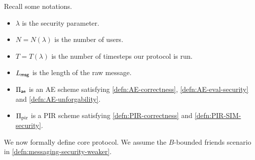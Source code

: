 Recall some notations.
\begin{itemize}
    \item $\lambda$ is the security parameter.
    \item $N = N(\lambda)$ is the number of users.
    \item $T = T(\lambda)$ is the number of timesteps our protocol is run.
    \item $L_{\mathsf{msg}}$ is the length of the raw message.
    \item $\Pi_{\mathsf{ae}}$ is an AE scheme satisfying \cref{defn:AE-correctness}, \cref{defn:AE-eval-security} and \cref{defn:AE-unforgability}.
    \item $\Pi_{\text{pir}}$ is a PIR scheme satisfying \cref{defn:PIR-correctness} and \cref{defn:PIR-SIM-security}.
\end{itemize}
We now formally define core protocol. We assume the $B$-bounded friends scenario in \cref{defn:messaging-security-weaker}.
